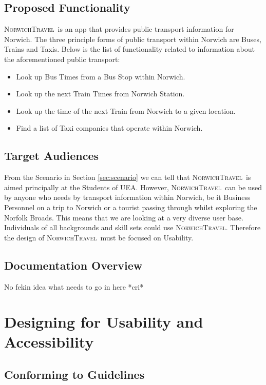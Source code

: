 \documentclass[cmpstyle]{ueacmpstyle}
\newcommand{\nt}{\textsc{NorwichTravel}}
\begin{document}
		\subsection{Proposed Functionality} \label{sec:prop-func}
		\nt \ is an app that provides public transport information for Norwich. The three principle forms of public transport within Norwich are Buses, Trains and Taxis. Below is the list of functionality related to information about the aforementioned public transport:
			\begin{itemize}
				\item Look up Bus Times from a Bus Stop within Norwich.
				\item Look up the next Train Times from Norwich Station.
				\item Look up the time of the next Train from Norwich to a given location.
				\item Find a list of Taxi companies that operate within Norwich. 
			\end{itemize} 
		
		\subsection{Target Audiences} \label{sec:target}
		From the Scenario in Section \ref{sec:scenario} we can tell that \nt \ is aimed principally at the Students of UEA. However, \nt \ can be used by anyone who needs by transport information within Norwich, be it Business Personnel on a trip to Norwich or a tourist passing through whilst exploring the Norfolk Broads. This means that we are looking at a very diverse user base. Individuals of all backgrounds and skill sets could use \nt. Therefore the design of \nt \ must be focused on Usability. 
		
		\subsection{Documentation Overview} \label{sec:doc-over}
		No fekin idea what needs to go in here *cri*
		
	\section{Designing for Usability and Accessibility} \label{sec:design}
	
		\subsection{Conforming to Guidelines} \label{sec:conform}
		
\end{document}
